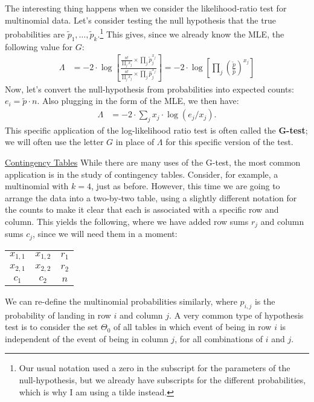 \documentclass{tufte-handout}
\begin{document}
The interesting thing happens when we consider the likelihood-ratio
test for multinomial data. Let's consider testing the null hypothesis
that the true probabilities are $\tilde{p}_1, \ldots, \tilde{p}_k$.\footnote{
  Our usual notation used a zero in the subscript for the parameters of
  the null-hypothesis, but we already have subscripts for the different
  probabilities, which is why I am using a tilde instead.
}
This gives, since we already know the MLE, the following value for $G$:
\begin{align*}
\Lambda &= -2 \cdot \log \left[ \frac{
  \frac{n!}{\prod_j x_j} \times \prod_j \tilde{p}_j^{x_j}
}{
  \frac{n!}{\prod_j x_j} \times \prod_j \hat{p}_j^{x_j}
} \right] = -2 \cdot \log \left[ \prod_j \left( \frac{\tilde{p}}{\hat{p}} \right)^{x_j} \right]
\end{align*}
Now, let's convert the null-hypothesis from probabilities into expected
counts: $e_i = \tilde{p} \cdot n$. Also plugging in the form of the MLE,
we then have:
\begin{align*}
\Lambda &= -2 \cdot \sum_j x_j \cdot \log(e_j / x_j).
\end{align*}
This specific application of the log-likelihood ratio test is often called
the \textbf{G-test}; we will often use the letter $G$ in place of $\Lambda$
for this specific version of the test.

\newpage

\noindent \underline{Contingency Tables}
While there are many uses of the G-test, the most common application 
is in the study of contingency tables. Consider, for example, a multinomial
with $k=4$, just as before. However, this time we are going to arrange
the data into a two-by-two table, using a slightly different notation for
the counts to make it clear that each is associated with a specific row
and column. This yields the following, where we have added row sums $r_j$
and column sums $c_j$, since we will need them in a moment: 
\begin{center}
\begin{tabular}{*3c}
\cline{1-2}
  \multicolumn{1}{|c|}{$x_{1,1}$} &
  \multicolumn{1}{|c|}{$x_{1,2}$} &
  \multicolumn{1}{|c}{$r_1$} \\  
\cline{1-2}
  \multicolumn{1}{|c|}{$x_{2,1}$} &
  \multicolumn{1}{|c|}{$x_{2,2}$} &
  \multicolumn{1}{|c}{$r_2$} \\ 
\cline{1-2}
  \multicolumn{1}{c}{$c_1$}
  & \multicolumn{1}{c}{$c_2$}
  & \multicolumn{1}{c}{$n$}
\end{tabular}
\end{center}
We can re-define the multinomial probabilities similarly, where $p_{i,j}$
is the probability of landing in row $i$ and column $j$. A very common
type of hypothesis test is to consider the set $\Theta_0$ of all tables
in which event of being in row $i$ is independent of the event of being
in column $j$, for all combinations of $i$ and $j$.
\end{document}
